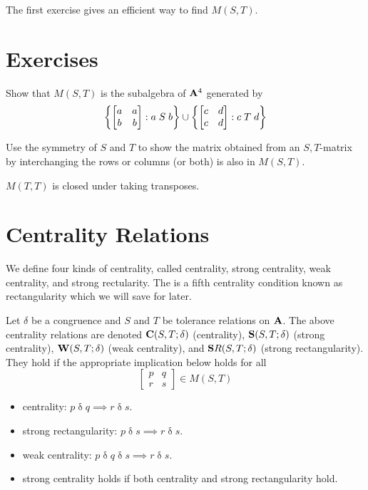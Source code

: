The first exercise gives an efficient way to find $M(S,T)$.

\section*{Exercises}

\begin{exercises}

\prob
Show that $M(S,T)$ is the subalgebra of $\mathbf{A}^4$ generated by
\[
\left\{
\begin{bmatrix}
a&a\\
b&b
\end{bmatrix} : a \mathrel{S} b\right\}
\union
\left\{
\begin{bmatrix}
c&d\\
c&d
\end{bmatrix} : c \mathrel{T} d\right\}
\]

\prob
Use the symmetry of $S$ and $T$ to show the matrix obtained from an
$S,T$-matrix by interchanging the rows or columns (or both) is also
in $M(S,T)$. 

\prob
$M(T,T)$ is closed under taking transposes. 

\end{exercises}

\section*{Centrality Relations}

We define four kinds of centrality, called centrality, strong
centrality, weak centrality, and strong rectularity. The is a fifth
centrality condition known as rectangularity which we will save for
later.

Let $\delta$ be a congruence and $S$ and $T$ be
tolerance relations on  $\mathbf{A}$. The above centrality relations
are denoted $\mathbf{C}(S,T;\delta)$ (centrality), 
$\mathbf{S}(S,T;\delta)$ (strong centrality), 
$\mathbf{W}(S,T;\delta)$ (weak centrality),  and
$\mathbf{S}R(S,T;\delta)$ (strong rectangularity). They hold if the
appropriate implication below holds for all 
\[
\begin{bmatrix}
p&q\\
r&s
\end{bmatrix} \in M(S,T)
\]
\begin{itemize}
\item centrality: 
$p \mathrel{\delta} q \implies r \mathrel{\delta} s$.
\item strong rectangularity: 
$p \mathrel{\delta} s \implies r \mathrel{\delta} s$.
\item weak centrality: 
$p \mathrel{\delta} q \mathrel{\delta} s \implies r \mathrel{\delta} s$.
\item strong centrality holds if both centrality and strong
rectangularity hold.
\end{itemize}

